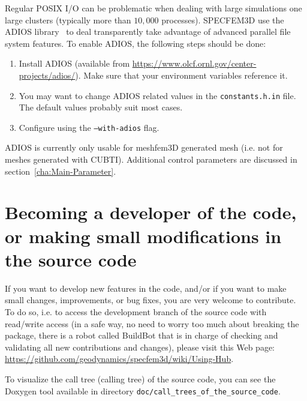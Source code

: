 Regular POSIX I/O can be problematic when dealing with large simulations one large
clusters (typically more than $10,000$ processes). SPECFEM3D use the ADIOS library~\cite{Liu2013}
to deal transparently take advantage of advanced parallel file system features. To enable
ADIOS, the following steps should be done:
\begin{enumerate}
\item Install ADIOS (available from \url{https://www.olcf.ornl.gov/center-projects/adios/}).
Make sure that your environment variables reference it.
\item You may want to change ADIOS related values in the \texttt{constants.h.in} file.
The default values probably suit most cases.
\item Configure using the \texttt{--with-adios} flag.
\end{enumerate}
ADIOS is currently only usable for meshfem3D generated mesh (i.e. not for meshes generated
with CUBTI). Additional control parameters are discussed in section~\ref{cha:Main-Parameter}.

\section{Becoming a developer of the code, or making small modifications in the source code}

If you want to develop new features in the code, and/or if you want to make small changes, improvements, or bug fixes, you are very welcome to contribute. To do so, i.e. to access the development branch of the source code with read/write access (in a safe way, no need to worry too much about breaking the package, there is a robot called BuildBot that is in charge of checking and validating all new contributions and changes), please visit this Web page: \url{https://github.com/geodynamics/specfem3d/wiki/Using-Hub}.

To visualize the call tree (calling tree) of the source code, you can see the Doxygen tool available in directory \texttt{doc/call\_trees\_of\_the\_source\_code}.



